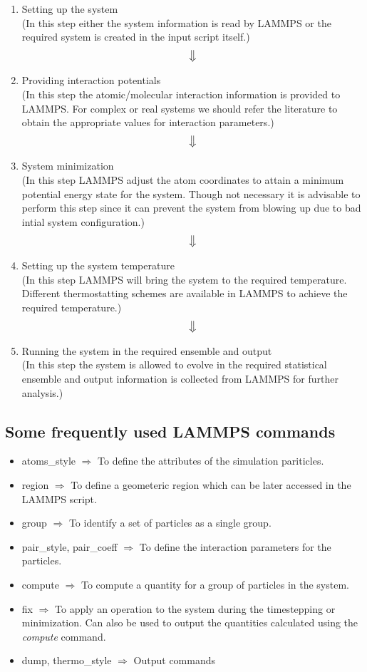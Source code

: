 \documentclass[12pt]{article}
\begin{document}
\begin{enumerate}
\centering
\item Setting up the system\\
(In this step either the system information is read by LAMMPS or 
the required system is created in the input script itself.)
$$\big\Downarrow$$
\item Providing interaction potentials \\
(In this step the atomic/molecular interaction information is provided to LAMMPS.
For complex or real systems we should refer the literature to obtain the 
appropriate values for interaction parameters.) \\
$$\big\Downarrow$$ 
\item System minimization \\
(In this step LAMMPS adjust the atom coordinates to attain a minimum potential energy state for 
the system. Though not necessary it is advisable to perform this step since it can prevent the 
system from blowing up due to bad intial system configuration.) \\
$$\big\Downarrow$$
\item Setting up the system temperature \\
(In this step LAMMPS will bring the system to the required temperature.
Different thermostatting schemes are available in LAMMPS to achieve the required temperature.) \\
$$\big\Downarrow$$
\item Running the system in the required ensemble and output \\
(In this step the system is allowed to evolve in the required statistical ensemble and 
output information is collected from LAMMPS for further analysis.)

\end{enumerate}

\newpage
\subsection{Some frequently used LAMMPS commands}
\begin{itemize}
\item atoms\_style $\Rightarrow$ To define the attributes of the simulation pariticles.
\item region $\Rightarrow$ To define a geometeric region which can be later accessed 
in the LAMMPS script.
\item group $\Rightarrow$ To identify a set of particles as a single group.
\item pair\_style, pair\_coeff $\Rightarrow$ To define the interaction parameters for the particles.
\item compute $\Rightarrow$ To compute a quantity for a group of particles in the system.
\item fix $\Rightarrow$ To apply an operation to the system during the timestepping or 
minimization. 
Can also be used to output the quantities calculated using the \textit{compute} command.
\item dump, thermo\_style $\Rightarrow$ Output commands
\end{itemize}
\end{document}
